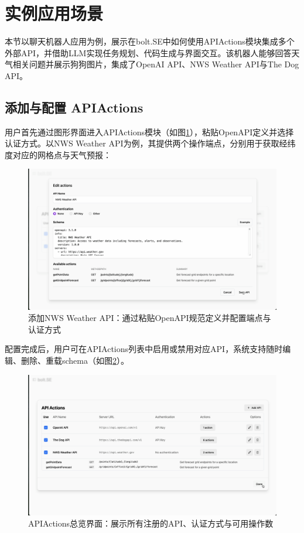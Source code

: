 \section{实例应用场景}

本节以聊天机器人应用为例，展示在bolt.SE中如何使用APIActions模块集成多个外部API，并借助LLM实现任务规划、代码生成与界面交互。该机器人能够回答天气相关问题并展示狗狗图片，集成了OpenAI API、NWS Weather API与The Dog API。

\subsection{添加与配置 APIActions}

用户首先通过图形界面进入APIActions模块（如图\ref{fig:demo_edit}），粘贴OpenAPI定义并选择认证方式。以NWS Weather API为例，其提供两个操作端点，分别用于获取经纬度对应的网格点与天气预报：

\begin{figure}[htbp]
  \centering
  \includegraphics[width=\textwidth]{figures/screenshots/api-actions/demo_edit_modal.png}
  \caption{添加NWS Weather API：通过粘贴OpenAPI规范定义并配置端点与认证方式}
  \label{fig:demo_edit}
\end{figure}

配置完成后，用户可在APIActions列表中启用或禁用对应API，系统支持随时编辑、删除、重载schema（如图\ref{fig:demo_table}）。

\begin{figure}[htbp]
  \centering
  \includegraphics[width=\textwidth]{figures/screenshots/api-actions/demo_actions_table.png}
  \caption{APIActions总览界面：展示所有注册的API、认证方式与可用操作数}
  \label{fig:demo_table}
\end{figure}

